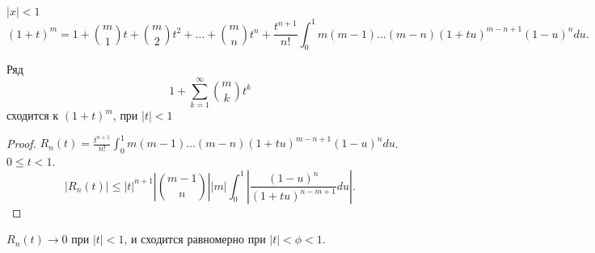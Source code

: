 \documentclass[11pt]{book}
\renewcommand{\le}{\leqslant}
\theoremstyle{definition}
\theoremstyle{plain}
\theoremstyle{plain}
\theoremstyle{definition}
\theoremstyle{remark}
\begin{document}
$ |x| < 1$
\[
    (1+t)^{m} = 1 + {m \choose 1} t + {m \choose 2} t^2 + \ldots  + {m \choose n} t ^{n} + \frac{t ^{n+1}}{n!} \int_0^{1} m (m-1) \ldots  (m-n) (1 + tu) ^{m-n+1} (1-u)^{n} du
.\]
\begin{thm}
    Ряд
    \[
	1 + \sum_{k=1}^{\infty} {m \choose k} t ^{k}
    \]
    сходится к $ (1+t)^{m}$, при $ |t|<1$
\end{thm}
\begin{proof}
    $ R_n(t) = \frac{t ^{n+1}}{n!} \int_0^{1} m (m-1) \ldots  (m-n) (1 + tu) ^{m-n+1} (1-u)^{n} du$.  $ 0 \le  t< 1$.
    \[
	|R_n(t) | \le  |t|^{n+1} \left| {m-1 \choose n} \right| |m| \int_0 ^{1} \left|\frac{(1-u)^{n}}{(1+tu)^{n-m+1}} du \right|
    .\]
\end{proof}
\begin{thm}
    $ R_n (t) \to 0$  при $ |t|<1$, и  сходится равномерно при $ |t| < \phi < 1$.
\end{thm}
\end{document}
